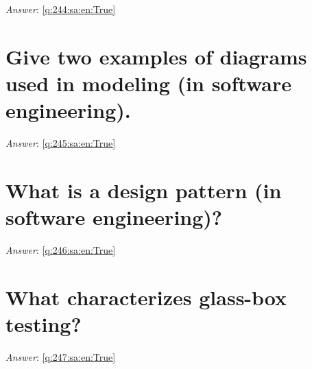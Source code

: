 \documentclass[a4paper,11pt,oneside]{book}
\begin{document}
\begin{sloppypar}
\label{q:244:sa:en:False}

\vspace{2cm}

\noindent\makebox[\textwidth]{\hrulefill}

\vspace{1cm}

\textit{Answer}: \autoref{q:244:sa:en:True}



\section{Give two examples of diagrams used in modeling (in software engineering).}

\label{q:245:sa:en:False}

\vspace{2cm}

\noindent\makebox[\textwidth]{\hrulefill}

\vspace{1cm}

\textit{Answer}: \autoref{q:245:sa:en:True}



\section{What is a design pattern (in software engineering)?}

\label{q:246:sa:en:False}

\vspace{2cm}

\noindent\makebox[\textwidth]{\hrulefill}

\vspace{1cm}

\textit{Answer}: \autoref{q:246:sa:en:True}



\section{What characterizes glass-box testing?}

\label{q:247:sa:en:False}

\vspace{2cm}

\noindent\makebox[\textwidth]{\hrulefill}

\vspace{1cm}

\textit{Answer}: \autoref{q:247:sa:en:True}




\end{sloppypar}
\end{document}
